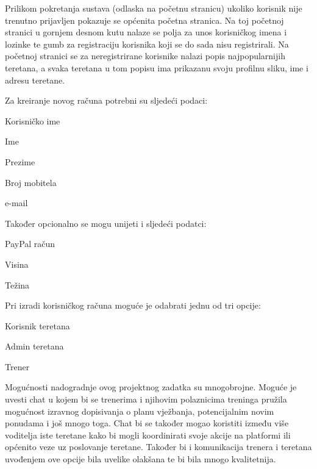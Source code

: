 		Prilikom pokretanja sustava (odlaska na početnu stranicu) ukoliko korisnik nije trenutno prijavljen pokazuje se općenita početna stranica. Na toj početnoj stranici u gornjem desnom kutu nalaze se polja za unos korisničkog imena i lozinke te gumb za registraciju korisnika koji se do sada nisu registrirali. Na početnoj stranici se za neregistrirane korisnike nalazi popis najpopularnijih teretana, a svaka teretana u tom popisu ima prikazanu svoju profilnu sliku, ime i adresu teretane.
		
		Za kreiranje novog računa potrebni su sljedeći podaci:

		\begin{packed_item}
			\item Korisničko ime
			\item Ime
			\item Prezime
			\item Broj mobitela
			\item e-mail
		\end{packed_item}
	
		Također opcionalno se mogu unijeti i sljedeći podatci:
		
		\begin{packed_item}
			\item PayPal račun
			\item Visina
			\item Težina
		\end{packed_item}
	
		Pri izradi korisničkog računa moguće je odabrati jednu od tri opcije:
		
		\begin{packed_item}
			\item Korisnik teretana
			\item Admin teretana
			\item Trener
		\end{packed_item}
	
	
	
	
	
		\vspace{5mm}
		
		Mogućnosti nadogradnje ovog projektnog zadatka su mnogobrojne. Moguće je uvesti chat u kojem bi se trenerima i njihovim polaznicima treninga pružila mogućnost izravnog dopisivanja o planu vježbanja, potencijalnim novim ponudama i 
		još mnogo toga. Chat bi se također mogao koristiti između više voditelja iste teretane kako bi mogli koordinirati svoje akcije na platformi ili općenito veze uz poslovanje teretane. Također bi i komunikacija trenera i teretana uvođenjem ove 
		opcije bila uvelike olakšana te bi bila mnogo kvalitetnija. 
		
